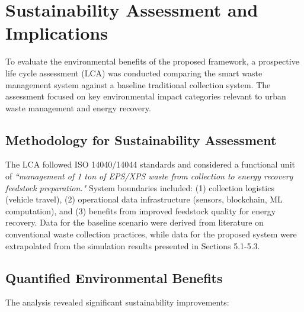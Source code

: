 \documentclass[final,5p,times,twocolumn]{elsarticle}
\begin{document}
\section{Sustainability Assessment and Implications}
To evaluate the environmental benefits of the proposed framework, a prospective life cycle assessment (LCA) was conducted comparing the smart waste management system against a baseline traditional collection system. The assessment focused on key environmental impact categories relevant to urban waste management and energy recovery.

\subsection{Methodology for Sustainability Assessment}
The LCA followed ISO 14040/14044 standards and considered a functional unit of \textit{``management of 1 ton of EPS/XPS waste from collection to energy recovery feedstock preparation."} System boundaries included: (1) collection logistics (vehicle travel), (2) operational data infrastructure (sensors, blockchain, ML computation), and (3) benefits from improved feedstock quality for energy recovery. Data for the baseline scenario were derived from literature on conventional waste collection practices, while data for the proposed system were extrapolated from the simulation results presented in Sections 5.1-5.3.

\subsection{Quantified Environmental Benefits}
The analysis revealed significant sustainability improvements:
\end{document}

